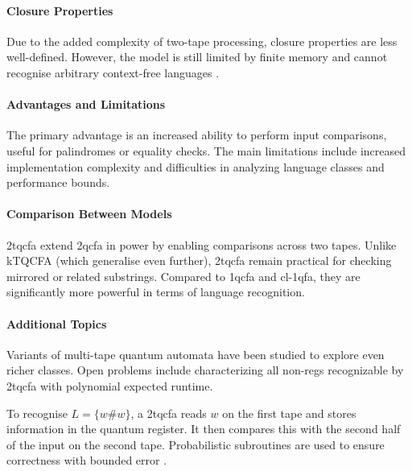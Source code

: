 \paragraph{Closure Properties}  
Due to the added complexity of two-tape processing, closure properties are less well-defined. However, the model is still limited by finite memory and cannot recognise arbitrary context-free languages \cite{li2015hybrid}.

\paragraph{Advantages and Limitations}  
The primary advantage is an increased ability to perform input comparisons, useful for palindromes or equality checks. The main limitations include increased implementation complexity and difficulties in analyzing language classes and performance bounds.

\paragraph{Comparison Between Models}  
\gls{2tqcfa} extend \gls{2qcfa} in power by enabling comparisons across two tapes. Unlike kTQCFA (which generalise even further), \gls{2tqcfa} remain practical for checking mirrored or related substrings. Compared to \gls{1qcfa} and \gls{cl-1qfa}, they are significantly more powerful in terms of language recognition.

\paragraph{Additional Topics}  
Variants of multi-tape quantum automata have been studied to explore even richer classes. Open problems include characterizing all non-\glspl{reg} recognizable by \gls{2tqcfa} with polynomial expected runtime.

\begin{example}
To recognise $L = \{ w \# w \}$, a \gls{2tqcfa} reads $w$ on the first tape and stores information in the quantum register. It then compares this with the second half of the input on the second tape. Probabilistic subroutines are used to ensure correctness with bounded error \cite{zheng2011two}.
\end{example}

\subsubsection{}

